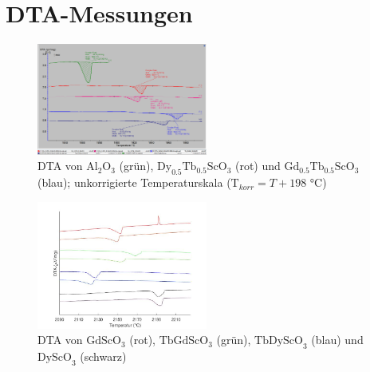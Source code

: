\documentclass[aps,twocolumn,secnumarabic,nobalancelastpage,amsmath,amssymb,
nofootinbib,superscriptaddress]{revtex4-1}
\begin{document}

\appendix
\section{DTA-Messungen}

\begin{figure}
  \centering
  \includegraphics[width=0.5\textwidth]{../img/Messungen_ComplexPeaks.png}
  \caption{\label{fig:dtaDyTb+TbGd_Gross} DTA von $\text{Al}_{2}\text{O}_3$ (grün), $\text{Dy}_{0.5}\text{Tb}_{0.5}\text{ScO}_3$ (rot)
  und $\text{Gd}_{0.5}\text{Tb}_{0.5}\text{ScO}_3$ (blau); unkorrigierte Temperaturskala ($\text{T}_{korr}=T + 198\text{ °C}$)}
\end{figure}

\begin{figure}
  \centering
   \includegraphics[width=0.5\textwidth]{../img/vglSkandate.jpg}
  \caption{\label{fig:dtaAllGross} DTA von $\text{GdScO}_3$ (rot), $\text{TbGdScO}_3$ (grün), $\text{TbDyScO}_3$ (blau) und $\text{DyScO}_3$ (schwarz)}
\end{figure}

\newpage

\end{document}
